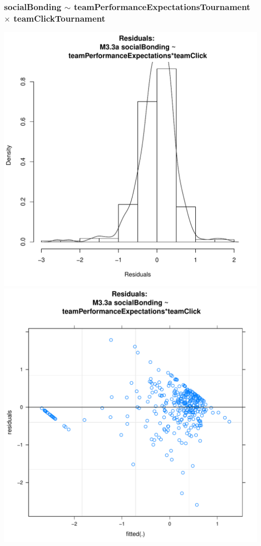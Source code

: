 \documentclass[12pt]{report}
\begin{document}
\subsubsection{socialBonding $\sim$ teamPerformanceExpectationsTournament $\times$ teamClickTournament}



\centering
\includegraphics[scale =.4]{../images/MLM33aHist.pdf}
\includegraphics[scale =.4]{../images/MLM33aScatter.pdf}
\end{document}
